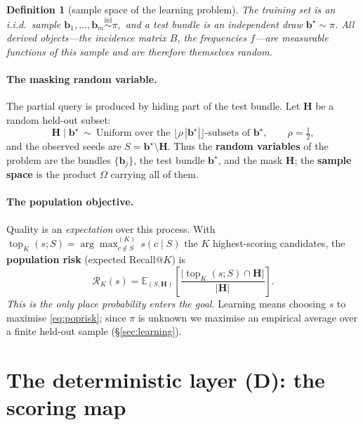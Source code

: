 \documentclass[11pt]{article}
\newtheorem{definition}{Definition}
\theoremstyle{remark}
\newcommand{\E}{\mathbb{E}}
\newcommand{\RK}{\mathcal{R}_K}
\newcommand{\argmaxK}{\arg\max\nolimits^{(K)}}
\begin{document}
\begin{definition}[sample space of the learning problem]
The training set is an i.i.d.\ sample
\(
  \mathbf b_1,\dots,\mathbf b_m \overset{\text{iid}}{\sim}\pi,
\)
and a test bundle is an independent draw $\mathbf b^\star\sim\pi$. All derived objects---the incidence matrix $B$,
the frequencies $f$---are measurable functions of this sample and are therefore \emph{themselves random}.
\end{definition}

\paragraph{The masking random variable.} The partial query is produced by hiding part of the test bundle. Let
$\mathbf H$ be a random held-out subset:
\[
  \mathbf H\mid \mathbf b^\star \ \sim\ \text{Uniform over the }\big\lfloor \rho\,|\mathbf b^\star|\big\rfloor\text{-subsets of }\mathbf b^\star,
  \qquad \rho=\tfrac12,
\]
and the observed seeds are $S=\mathbf b^\star\setminus\mathbf H$. Thus the \textbf{random variables} of the problem
are the bundles $\{\mathbf b_j\}$, the test bundle $\mathbf b^\star$, and the mask $\mathbf H$; the \textbf{sample
space} is the product $\Omega$ carrying all of them.

\paragraph{The population objective.} Quality is an \emph{expectation} over this process. With
$\operatorname{top}_K(s;S)=\argmaxK_{c\notin S}\,s(c\mid S)$ the $K$ highest-scoring candidates, the
\textbf{population risk} (expected Recall@$K$) is
\begin{equation}
  \boxed{\;\RK(s)=\E_{(S,\mathbf H)}\!\left[\frac{\big|\operatorname{top}_K(s;S)\cap \mathbf H\big|}{|\mathbf H|}\right].\;}
  \label{eq:poprisk}
\end{equation}
\emph{This is the only place probability enters the goal.} Learning means choosing $s$ to maximise
\eqref{eq:poprisk}; since $\pi$ is unknown we maximise an empirical average over a finite held-out sample
(\S\ref{sec:learning}).

\section{The deterministic layer (D): the scoring map}
\label{sec:deterministic}
\end{document}
